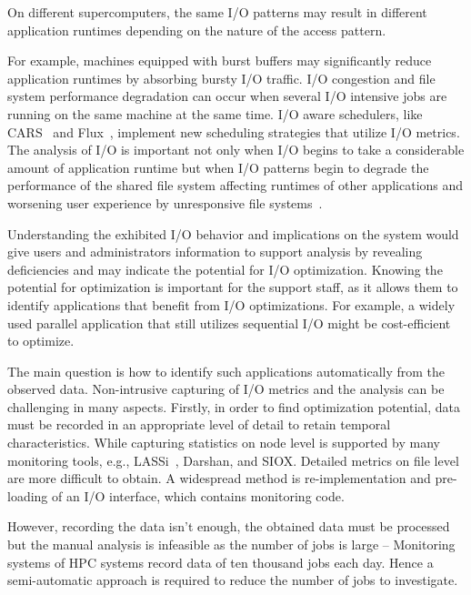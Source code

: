 \documentclass[]{llncs}
\begin{document}
On different supercomputers, the same I/O patterns may result in different application runtimes depending on the nature of the access pattern.

For example, machines equipped with burst buffers \cite{10.1007/978-3-030-02465-9_9, 7004215} may significantly reduce application runtimes by absorbing bursty I/O traffic.
I/O congestion and file system performance degradation can occur when several I/O intensive jobs are running on the same machine at the same time.
I/O aware schedulers, like CARS~\cite{LIANG201925} and Flux~\cite{flux}, implement new scheduling strategies that utilize I/O metrics.
The analysis of I/O is important not only when I/O begins to take a considerable amount of application runtime but when I/O patterns begin to degrade the performance of the shared file system affecting runtimes of other applications and worsening user experience by unresponsive file systems~\cite{10.1007/978-3-030-02465-9_5}.

Understanding the exhibited I/O behavior and implications on the system would give users and administrators information to support analysis by revealing deficiencies and may indicate the potential for I/O optimization.
Knowing the potential for optimization is important for the support staff, as it allows them to identify applications that benefit from I/O optimizations.
For example, a widely used parallel application that still utilizes sequential I/O might be cost-efficient to optimize.

The main question is how to identify such applications automatically from the observed data.
Non-intrusive capturing of I/O metrics and the analysis can be challenging in many aspects.
Firstly, in order to find optimization potential, data must be recorded in an appropriate level of detail to retain temporal characteristics.
While capturing statistics on node level is supported by many monitoring tools, e.g., LASSi~\cite{sivalingam2019lassi}, Darshan\cite{hpcdarshan}, and SIOX\cite{TSACAMAOOP14}.
Detailed metrics on file level are more difficult to obtain.
A widespread method is re-implementation and pre-loading of an I/O interface, which contains monitoring code.

However, recording the data isn't enough, the obtained data must be processed but the manual analysis is infeasible as the number of jobs is large -- Monitoring systems of HPC systems record data of ten thousand jobs each day.
Hence a semi-automatic approach is required to reduce the number of jobs to investigate.
\end{document}
